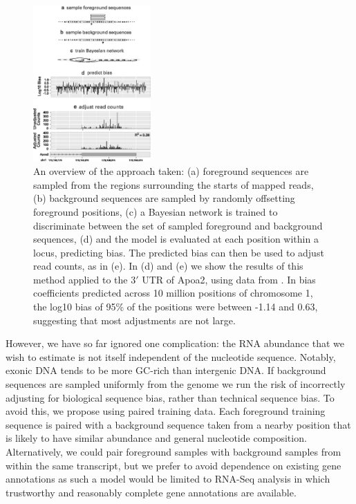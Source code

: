 \documentclass{bioinfo}
\begin{document}
\begin{figure}
\centerline{\includegraphics[width=0.4\textwidth]{overview.eps}}
\caption{An overview of the approach taken: (a) foreground sequences are sampled
from the regions surrounding the starts of mapped reads, (b) background
sequences are sampled by randomly offsetting foreground positions, (c) a
Bayesian network is trained to discriminate between the set of
sampled foreground and background sequences, (d) and the model is evaluated
at each position within a locus, predicting bias. The predicted bias can then be
used to adjust read counts, as in (e). In (d) and (e) we show the results of
this method applied to the $3'$ UTR of Apoa2, using data from
\citet{Mortazavi2008}. In bias coefficients predicted across 10 million positions
of chromosome 1, the log10 bias of 95\% of the positions were between -1.14 and
0.63, suggesting that most adjustments are not large.
}
\label{fig:overview}
\end{figure}

However, we have so far ignored one complication: the RNA abundance that we wish
to estimate is not itself independent of the nucleotide sequence. Notably,
exonic DNA tends to be more GC-rich than intergenic DNA. If background sequences
are sampled uniformly from the genome we run the risk of incorrectly adjusting
for biological sequence bias, rather than technical sequence bias.  To avoid
this, we propose using paired training data. Each foreground training
sequence is paired with a background sequence taken from a nearby position
that is likely to have similar abundance and general nucleotide composition.
Alternatively, we could pair foreground samples with background samples from
within the same transcript, but we prefer to avoid dependence on existing
gene annotations as such a model would be limited to RNA-Seq analysis in which
trustworthy and reasonably complete gene annotations are available.
\end{document}
